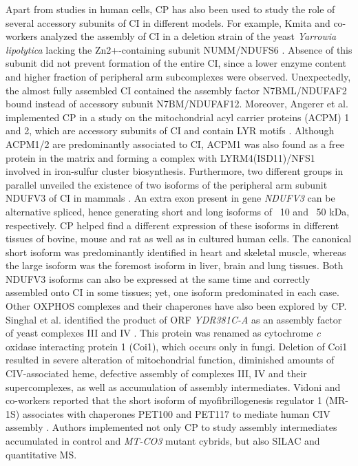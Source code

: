 Apart from studies in human cells, CP has also been used to study the role of several accessory subunits of CI in different models. For example, Kmita and co-workers analyzed the assembly of CI in a deletion strain of the yeast \emph{Yarrowia lipolytica} lacking the Zn2+-containing subunit NUMM/NDUFS6 \cite{Kmita_2015}. Absence of this subunit did not prevent formation of the entire CI, since a lower enzyme content and higher fraction of peripheral arm subcomplexes were observed. Unexpectedly, the almost fully assembled CI contained the assembly factor N7BML/NDUFAF2 bound instead of accessory subunit N7BM/NDUFAF12. Moreover, Angerer et al. implemented CP in a study on the mitochondrial acyl carrier proteins (ACPM) 1 and 2, which are accessory subunits of CI and contain LYR motifs \cite{Angerer_2014}. Although ACPM1/2 are predominantly associated to CI, ACPM1 was also found as a free protein in the matrix and forming a complex with LYRM4(ISD11)/NFS1 involved in iron-sulfur cluster biosynthesis. Furthermore, two different groups in parallel unveiled the existence of two isoforms of the peripheral arm subunit NDUFV3 of CI in mammals \cite{Bridges_2017, Guerrero-Castillo_2017b}. An extra exon present in gene \emph{NDUFV3} can be alternative spliced, hence generating short and long isoforms of ~10 and ~50 kDa, respectively. CP helped find a different expression of these isoforms in different tissues of bovine, mouse and rat as well as in cultured human cells. The canonical short isoform was predominantly identified in heart and skeletal muscle, whereas the large isoform was the foremost isoform in liver, brain and lung tissues. Both NDUFV3 isoforms can also be expressed at the same time and correctly assembled onto CI in some tissues; yet, one isoform predominated in each case.\\
Other OXPHOS complexes and their chaperones have also been explored by CP. Singhal et al. identified the product of ORF \emph{YDR381C-A} as an assembly factor of yeast complexes III and IV \cite{Singhal_2017}. This protein was renamed as cytochrome \emph{c} oxidase interacting protein 1 (Coi1), which occurs only in fungi. Deletion of Coi1 resulted in severe alteration of mitochondrial function, diminished amounts of CIV-associated heme, defective assembly of complexes III, IV and their supercomplexes, as well as accumulation of assembly intermediates. Vidoni and co-workers reported that the short isoform of myofibrillogenesis regulator 1 (MR-1S) associates with chaperones PET100 and PET117 to mediate human CIV assembly \cite{Vidoni_2017}. Authors implemented not only CP to study assembly intermediates accumulated in control and \emph{MT-CO3} mutant cybrids, but also SILAC and quantitative MS.\\
